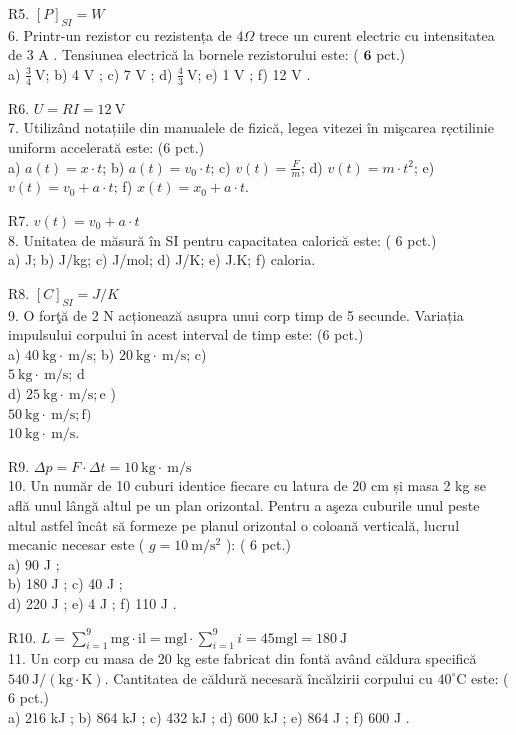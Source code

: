 R5. $[P]_{S I}=W$\\
6. Printr-un rezistor cu rezistența de $4 \Omega$ trece un curent electric cu intensitatea de 3 A . Tensiunea electrică la bornele rezistorului este: ( $\mathbf{6}$ pct.)\\
a) $\frac{3}{4} \mathrm{~V}$; b) 4 V ; c) 7 V ; d) $\frac{4}{3} \mathrm{~V}$; e) 1 V ; f) 12 V .

R6. $U=R I=12 \mathrm{~V}$\\
7. Utilizând notațiile din manualele de fizică, legea vitezei în mişcarea rẹctilinie uniform accelerată este: (6 pct.)\\
a) $a(t)=x \cdot t$; b) $a(t)=v_{0} \cdot t$; c) $v(t)=\frac{F}{m}$; d) $v(t)=m \cdot t^{2}$; e) $v(t)=v_{0}+a \cdot t$; f) $x(t)=x_{0}+a \cdot t$.

R7. $v(t)=v_{0}+a \cdot t$\\
8. Unitatea de măsură în SI pentru capacitatea calorică este: ( 6 pct.)\\
a) J; b) J/kg; c) J/mol; d) J/K; e) J.K; f) caloria.

R8. $[C]_{S I}=J / K$\\
9. O forţă de 2 N acționează asupra unui corp timp de 5 secunde. Variația impulsului corpului în acest interval de timp este: (6 pct.)\\
a) $40 \mathrm{~kg} \cdot \mathrm{~m} / \mathrm{s}$; b) $20 \mathrm{~kg} \cdot \mathrm{~m} / \mathrm{s}$; c)\\
$5 \mathrm{~kg} \cdot \mathrm{~m} / \mathrm{s}$; d\\
d) $25 \mathrm{~kg} \cdot \mathrm{~m} / \mathrm{s} ; \mathrm{e}$ )\\
$50 \mathrm{~kg} \cdot \mathrm{~m} / \mathrm{s} ; \mathrm{f})$\\
$10 \mathrm{~kg} \cdot \mathrm{~m} / \mathrm{s}$.

R9. $\Delta p=F \cdot \Delta t=10 \mathrm{~kg} \cdot \mathrm{~m} / \mathrm{s}$\\
10. Un număr de 10 cuburi identice fiecare cu latura de 20 cm și masa 2 kg se află unul lângă altul pe un plan orizontal. Pentru a aşeza cuburile unul peste altul astfel încât să formeze pe planul orizontal o coloană verticală, lucrul mecanic necesar este ( $g=10 \mathrm{~m} / \mathrm{s}^{2}$ ): ( 6 pct.)\\
a) 90 J ;\\
b) 180 J ; c) 40 J ;\\
d) 220 J ; e) 4 J ; f) 110 J .

R10. $L=\sum_{i=1}^{9} \mathrm{mg} \cdot \mathrm{il}=\mathrm{mgl} \cdot \sum_{i=1}^{9} i=45 \mathrm{mgl}=180 \mathrm{~J}$\\
11. Un corp cu masa de 20 kg este fabricat din fontă având căldura specifică $540 \mathrm{~J} /(\mathrm{kg} \cdot \mathrm{K})$. Cantitatea de căldură necesară încălzirii corpului cu $40^{\circ} \mathrm{C}$ este: ( 6 pct.)\\
a) 216 kJ ; b) 864 kJ ; c) 432 kJ ; d) 600 kJ ; e) 864 J ; f) 600 J .


